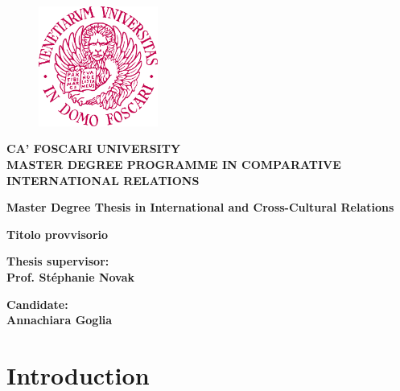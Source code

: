 \documentclass[12pt]{report}
\begin{document}
\begin{titlepage}
\begin{figure}[t]
    \centering\includegraphics[width=0.35\textwidth]{images/logo.png}
\end{figure}

\begin{center}
    \textbf{ {\large{CA' FOSCARI UNIVERSITY}}\\ \vspace{3mm} MASTER DEGREE PROGRAMME IN COMPARATIVE INTERNATIONAL RELATIONS}
   \vspace{10mm}
   
   \textbf{Master Degree Thesis in International and Cross-Cultural Relations}
    
    \vspace{15mm}
    {\LARGE{\bf Titolo provvisorio}}\\
\end{center}

\vspace{21mm}

\begin{minipage}[t]{0.47\textwidth}
    {\large{\bf Thesis supervisor:\\ Prof. Stéphanie Novak}}
\end{minipage}\hfill\begin{minipage}[t]{0.47\textwidth}\raggedleft
    {\large{\bf Candidate:\\ Annachiara Goglia \\ }}
\end{minipage}
\vspace{40mm}

\end{titlepage}

\tableofcontents
\clearpage\mbox{}\clearpage

\chapter{Introduction}

\end{document}
